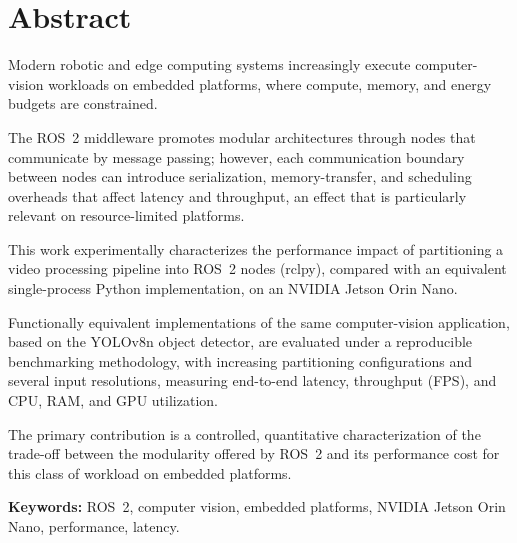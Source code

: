\chapter*{Abstract}

Modern robotic and edge computing systems increasingly execute computer-vision workloads on
embedded platforms, where compute, memory, and energy budgets are
constrained. 

The ROS~2 middleware promotes modular architectures through
nodes that communicate by message passing; however, each communication
boundary between nodes can introduce serialization, memory-transfer, and
scheduling overheads that affect latency and throughput, an effect that is
particularly relevant on resource-limited platforms. 

This work experimentally characterizes the performance impact of partitioning a video
processing pipeline into ROS~2 nodes (rclpy), compared with an equivalent
single-process Python implementation, on an NVIDIA Jetson Orin Nano.

Functionally equivalent implementations of the same computer-vision
application, based on the YOLOv8n object detector, are evaluated under a
reproducible
benchmarking methodology, with increasing partitioning configurations and several input resolutions,
measuring end-to-end latency, throughput (FPS), and CPU, RAM, and GPU
utilization.


 The
primary contribution is a controlled, quantitative characterization of the
trade-off between the modularity offered by ROS~2 and its performance cost
for this class of workload on embedded platforms.

\bigskip
\noindent\textbf{Keywords:} ROS~2, computer vision, embedded platforms,
NVIDIA Jetson Orin Nano, performance, latency.

